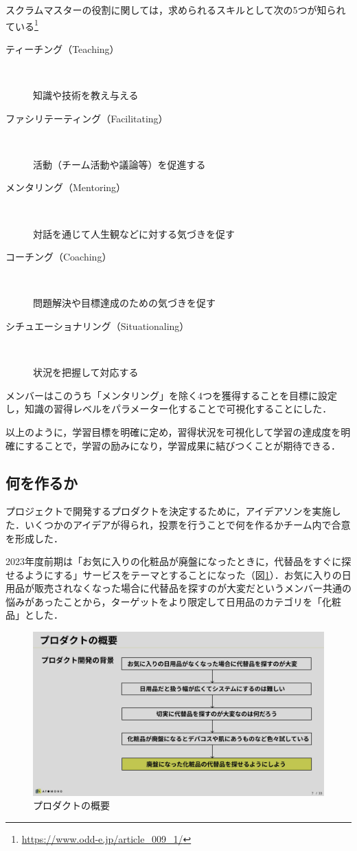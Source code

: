 \documentclass[fontsize=9pt, jafontscale=.95, twocolumn, a4paper]{jlreq}
\begin{document}
スクラムマスターの役割に関しては，求められるスキルとして次の5つが知られている\footnote{\url{https://www.odd-e.jp/article\_009\_1/}}

\begin{description}
\item[{ティーチング（Teaching）}]　%

知識や技術を教え与える
\item[{ファシリテーティング（Facilitating）}]　

活動（チーム活動や議論等）を促進する
\item[{メンタリング（Mentoring）}]　

対話を通じて人生観などに対する気づきを促す
\item[{コーチング（Coaching）}]　

問題解決や目標達成のための気づきを促す
\item[{シチュエーショナリング（Situationaling）}]　

状況を把握して対応する
\end{description}

メンバーはこのうち「メンタリング」を除く4つを獲得することを目標に設定し，知識の習得レベルをパラメーター化することで可視化することにした．

以上のように，学習目標を明確に定め，習得状況を可視化して学習の達成度を明確にすることで，学習の励みになり，学習成果に結びつくことが期待できる．

\subsection{何を作るか}
\label{sec:org0a7ccf8}
プロジェクトで開発するプロダクトを決定するために，アイデアソンを実施した．いくつかのアイデアが得られ，投票を行うことで何を作るかチーム内で合意を形成した．

2023年度前期は「お気に入りの化粧品が廃盤になったときに，代替品をすぐに探せるようにする」サービスをテーマとすることになった（図\ref{fig:プロダクトの概要}）．お気に入りの日用品が販売されなくなった場合に代替品を探すのが大変だというメンバー共通の悩みがあったことから，ターゲットをより限定して日用品のカテゴリを「化粧品」とした．

\begin{figure}[tb]
\centering
\includegraphics[width=.9\linewidth]{./images/前期発表資料_ページ_07.png}
\caption{\label{fig:プロダクトの概要}プロダクトの概要}
\end{figure}
\end{document}
